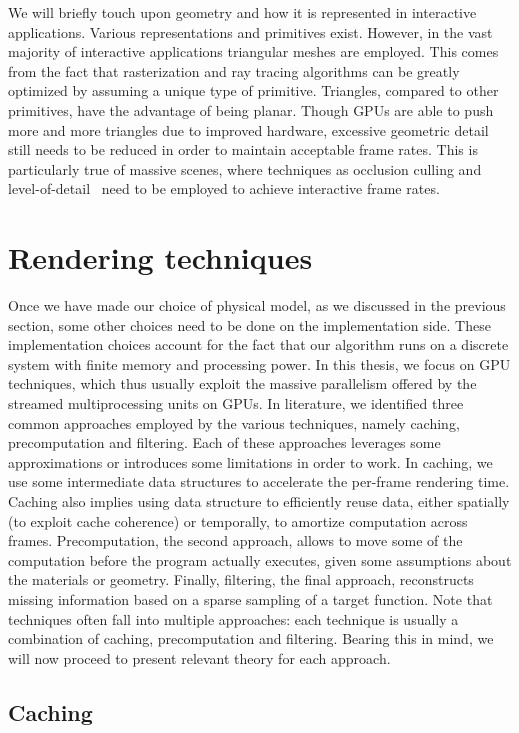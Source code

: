 We will briefly touch upon geometry and how it is represented in interactive applications. Various representations and primitives exist. However, in the vast majority of interactive applications triangular meshes are employed. This comes from the fact that rasterization and ray tracing algorithms can be greatly optimized by assuming a unique type of primitive. Triangles, compared to other primitives, have the advantage of being planar. Though GPUs are able to push more and more triangles due to improved hardware, excessive geometric detail still needs to be reduced in order to maintain acceptable frame rates. This is particularly true of massive scenes, where techniques as occlusion culling and level-of-detail~\cite{Clark1976} need to be employed to achieve interactive frame rates. 

\section{Rendering techniques}
%
Once we have made our choice of physical model, as we discussed in the previous section,  some other choices need to be done on the implementation side. These implementation choices account for the fact that our algorithm runs on a discrete system with finite memory and processing power. In this thesis, we focus on GPU techniques, which thus usually exploit the massive parallelism offered by the streamed multiprocessing units on GPUs. In literature, we identified three common approaches employed by the various techniques, namely caching, precomputation and filtering. Each of these approaches leverages some approximations or introduces some limitations in order to work. In caching, we use some intermediate data structures to accelerate the per-frame rendering time. Caching also implies using data structure to efficiently reuse data, either spatially (to exploit cache coherence) or temporally, to amortize computation across frames. Precomputation, the second approach, allows to move some of the computation before the program actually executes, given some assumptions about the materials or geometry. Finally, filtering, the final approach, reconstructs missing information based on a sparse sampling of a target function. Note that techniques often fall into multiple approaches: each technique is usually a combination of caching, precomputation and filtering. Bearing this in mind, we will now proceed to present relevant theory for each approach. 

%
\subsection{Caching}


